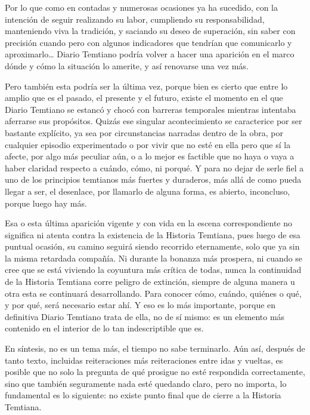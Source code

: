 \documentclass[
]{book}
\begin{document}
Por lo que como en contadas y numerosas ocasiones ya ha sucedido, con la intención de seguir realizando su labor, cumpliendo su responsabilidad, manteniendo viva la tradición, y saciando su deseo de superación, sin saber con precisión cuando pero con algunos indicadores que tendrían que comunicarlo y aproximarlo\ldots{} Diario Temtiano podría volver a hacer una aparición en el marco dónde y cómo la situación lo amerite, y así renovarse una vez más.

Pero también esta podría ser la última vez, porque bien es cierto que entre lo amplio que es el pasado, el presente y el futuro, existe el momento en el que Diario Temtiano se estancó y chocó con barreras temporales mientras intentaba aferrarse sus propósitos. Quizás ese singular acontecimiento se caracterice por ser bastante explícito, ya sea por circunstancias narradas dentro de la obra, por cualquier episodio experimentado o por vivir que no esté en ella pero que sí la afecte, por algo más peculiar aún, o a lo mejor es factible que no haya o vaya a haber claridad respecto a cuándo, cómo, ni porqué. Y para no dejar de serle fiel a uno de los principios temtianos más fuertes y duraderos, más allá de como pueda llegar a ser, el desenlace, por llamarlo de alguna forma, es abierto, inconcluso, porque luego hay más.

Esa o esta última aparición vigente y con vida en la escena correspondiente no significa ni atenta contra la existencia de la Historia Temtiana, pues luego de esa puntual ocasión, su camino seguirá siendo recorrido eternamente, solo que ya sin la misma retardada compañía. Ni durante la bonanza más prospera, ni cuando se cree que se está viviendo la coyuntura más crítica de todas, nunca la continuidad de la Historia Temtiana corre peligro de extinción, siempre de alguna manera u otra esta se continuará desarrollando. Para conocer cómo, cuándo, quiénes o qué, y por qué, será necesario estar ahí. Y eso es lo más importante, porque en definitiva Diario Temtiano trata de ella, no de sí mismo: es un elemento más contenido en el interior de lo tan indescriptible que es.

En síntesis, no es un tema más, el tiempo no sabe terminarlo. Aún así, después de tanto texto, incluidas reiteraciones más reiteraciones entre idas y vueltas, es posible que no solo la pregunta de qué prosigue no esté respondida correctamente, sino que también seguramente nada esté quedando claro, pero no importa, lo fundamental es lo siguiente: no existe punto final que de cierre a la Historia Temtiana.
\end{document}
